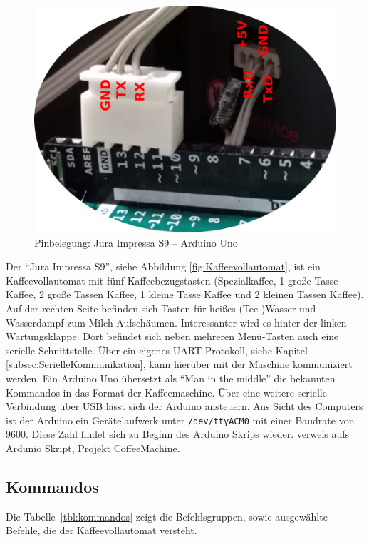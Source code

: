 \begin{figure}
  \begin{center}
    \includegraphics[scale=0.3]{images/Jura-Arduino-Pins-beschriftet-small}
    \caption{Pinbelegung: Jura Impressa S9 -- Arduino Uno}
    \label{fig:KaffeevollautomatPins}
  \end{center}
\end{figure}

Der "`Jura Impressa S9"', siehe Abbildung \ref{fig:Kaffeevollautomat}, ist ein Kaffeevollautomat mit fünf Kaffeebezugstasten (Spezialkaffee, 1 große Tasse Kaffee, 2 große Tassen Kaffee, 1 kleine Tasse Kaffee und 2 kleinen Tassen Kaffee).
Auf der rechten Seite befinden sich Tasten für heißes (Tee-)Wasser und Wasserdampf zum Milch Aufschäumen.
Interessanter wird es hinter der linken Wartungsklappe. Dort befindet sich neben mehreren Menü-Tasten auch eine serielle Schnittstelle.
Über ein eigenes \ac{UART} Protokoll, siehe Kapitel \ref{subsec:SerielleKommunikation}, kann hierüber mit der Maschine kommuniziert werden.
Ein Arduino Uno übersetzt als "`Man in the middle"' die bekannten Kommandos in das Format der Kaffeemaschine. Über eine weitere serielle Verbindung über USB lässt sich der Arduino ansteuern. Aus Sicht des Computers ist der Arduino ein Gerätelaufwerk unter \texttt{/dev/ttyACM0} mit einer Baudrate von 9600. Diese Zahl findet sich zu Beginn des Arduino Skrips wieder. \todo verweis aufs Ardunio Skript, Projekt CoffeeMachine.

\subsection{Kommandos}
Die Tabelle~\ref{tbl:kommandos} zeigt die Befehlsgruppen, sowie ausgewählte Befehle, die der Kaffeevollautomat versteht.

